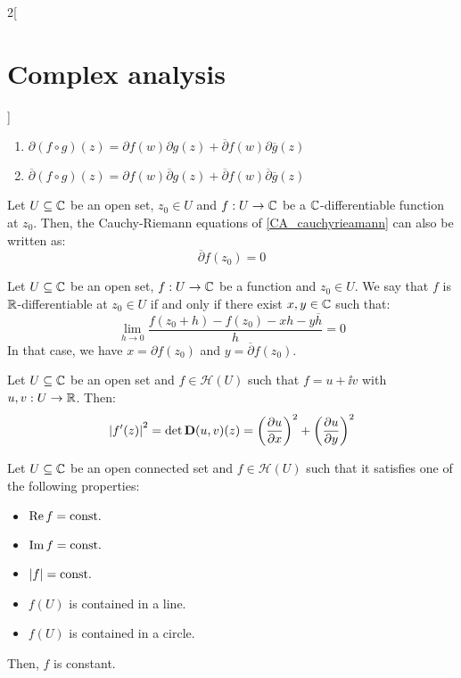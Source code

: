 \documentclass[../../../main.tex]{subfiles}
\begin{document}
\begin{multicols}{2}[\section{Complex analysis}]
\begin{proposition}
    \begin{enumerate}
      \item $\partial(f\circ g)(z)=\partial f(w)\partial g(z)+\overline{\partial}f(w)\partial \overline{g}(z)$
      \item $\overline{\partial}(f\circ g)(z)=\partial f(w)\overline{\partial} g(z)+\overline{\partial}f(w)\overline{\partial} \overline{g}(z)$
    \end{enumerate}
  \end{proposition}
  \begin{proposition}
    Let $U\subseteq \mathbb{C}$ be an open set, $z_0\in U$ and $f:U\rightarrow \mathbb{C}$ be a $\mathbb{C}$-differentiable function at $z_0$. Then, the Cauchy-Riemann equations of \cref{CA_cauchyrieamann} can also be written as: $$\overline{\partial} f(z_0)=0$$
  \end{proposition}
  \begin{proposition}
    Let $U\subseteq \mathbb{C}$ be an open set, $f:U\rightarrow \mathbb{C}$ be a function and $z_0\in U$. We say that $f$ is $\mathbb{R}$-differentiable at $z_0\in U$ if and only if there exist $x,y\in \mathbb{C}$ such that: $$\lim_{h\to 0}\frac{f(z_0+h)-f(z_0)-xh-y\overline{h}}{h}=0$$
    In that case, we have $x=\partial f(z_0)$ and $y=\overline{\partial} f(z_0)$.
  \end{proposition}
  \begin{proposition}
    Let $U\subseteq \mathbb{C}$ be an open set and $f\in\mathcal{H}(U)$ such that $f=u+\ii v$ with $u,v:U\rightarrow\mathbb{R}$. Then:
    $${|f'(z)|}^2=\det \boldsymbol{\mathrm{D}}(u,v)(z)={\left(\pdv{u}{x}\right)}^2+{\left(\pdv{u}{y}\right)}^2$$
  \end{proposition}
  \begin{proposition}
    Let $U\subseteq \mathbb{C}$ be an open connected set and $f\in\mathcal{H}(U)$ such that it satisfies one of the following properties:
    \begin{itemize}
      \item $\Re f=\text{const.}$
      \item $\Im f=\text{const.}$
      \item $\abs{f}=\text{const.}$
      \item $f(U)$ is contained in a line.
      \item $f(U)$ is contained in a circle.
    \end{itemize}
    Then, $f$ is constant.
  \end{proposition}

\end{multicols}
\end{document}

